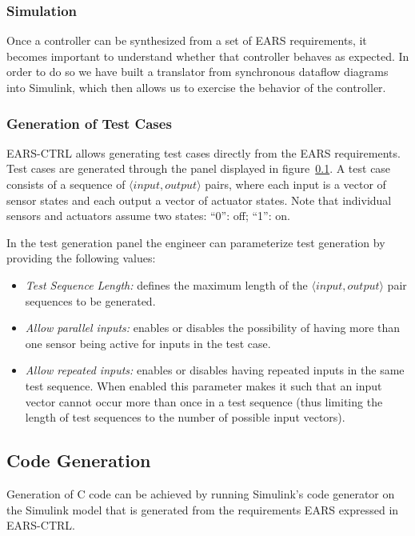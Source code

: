 \subsubsection{Simulation}

Once a controller can be synthesized from a set of EARS requirements, it becomes
important to understand whether that controller behaves as expected. In order to
do so we have built a translator from synchronous dataflow diagrams into
\textsf{Simulink}, which then allows us to exercise the behavior of the
controller.

\subsubsection{Generation of Test Cases}

\textsf{EARS-CTRL} allows generating test cases directly from the EARS
requirements. Test cases are generated through the panel displayed in
figure~\ref{}. A test case consists of a sequence of $\langle
  input, output \rangle$ pairs, where each input is a vector of sensor states
  and each output a vector of actuator states. Note that individual sensors and
  actuators assume two states: ``0'': off; ``1'': on.

In the test generation panel the engineer can parameterize test generation by
providing the following values:
\begin{itemize}
  \item \emph{Test Sequence Length:} defines the maximum length of the $\langle
  input, output \rangle$ pair sequences to be generated.
  \item \emph{Allow parallel inputs:} enables or disables the possibility of
  having more than one sensor being active for inputs in the test case.
  \item \emph{Allow repeated inputs:} enables or disables having repeated inputs
  in the same test sequence. When enabled this parameter makes it such that
  an input vector cannot occur more than once in a test sequence (thus limiting
  the length of test sequences to the number of possible input vectors).
\end{itemize} 


\subsection{Code Generation}

Generation of C code can be achieved by running Simulink's code generator on the
Simulink model that is generated from the requirements EARS expressed in 
\textsf{EARS-CTRL}.
